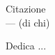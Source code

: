 
\cleardoublepage
{}
\thispagestyle{empty}

\vspace*{3cm}

\begin{center}
  Citazione \\ \medskip
  --- (di chi)
\end{center}

\medskip

\begin{center}
  Dedica ...
\end{center}